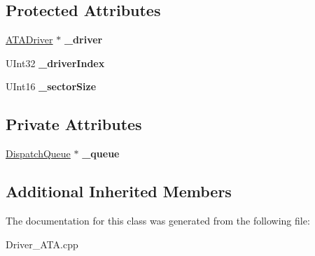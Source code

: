 \subsection*{Protected Attributes}
\begin{DoxyCompactItemize}
\item 
\mbox{\label{class_a_t_a_driver_drive_aa880819cc83891928b099d242aa41591}} 
\hyperlink{class_a_t_a_driver}{A\+T\+A\+Driver} $\ast$ {\bfseries \+\_\+driver}
\item 
\mbox{\label{class_a_t_a_driver_drive_a93a8d1eb7eab06302e2662985bfca604}} 
U\+Int32 {\bfseries \+\_\+driver\+Index}
\item 
\mbox{\label{class_a_t_a_driver_drive_a72ee849627a09af62a58dce5bdee7a7e}} 
U\+Int16 {\bfseries \+\_\+sector\+Size}
\end{DoxyCompactItemize}
\subsection*{Private Attributes}
\begin{DoxyCompactItemize}
\item 
\mbox{\label{class_a_t_a_driver_drive_aa3cea150d3b22e5ceeb617ed841c8bf5}} 
\hyperlink{class_dispatch_queue}{Dispatch\+Queue} $\ast$ {\bfseries \+\_\+queue}
\end{DoxyCompactItemize}
\subsection*{Additional Inherited Members}


The documentation for this class was generated from the following file\+:\begin{DoxyCompactItemize}
\item 
Driver\+\_\+\+A\+T\+A.\+cpp\end{DoxyCompactItemize}
